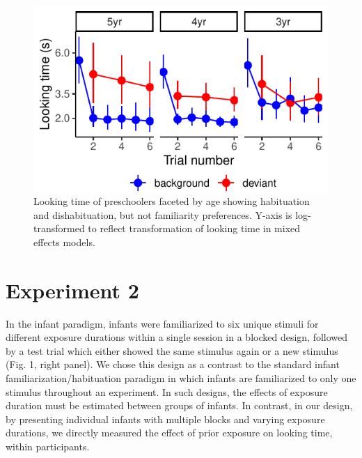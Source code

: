 \documentclass[10pt, letterpaper]{article}
\newenvironment{CodeChunk}{}{}
\begin{document}
\begin{CodeChunk}
\begin{figure}[t!]

\includegraphics{figs/unnamed-chunk-13-1} \hfill{}

\caption[Looking time of preschoolers faceted by age showing habituation and dishabituation, but not familiarity preferences]{Looking time of preschoolers faceted by age showing habituation and dishabituation, but not familiarity preferences. Y-axis is log-transformed to reflect transformation of looking time in mixed effects models.}\label{fig:unnamed-chunk-13}
\end{figure}
\end{CodeChunk}

\hypertarget{experiment-2}{%
\section{Experiment 2}\label{experiment-2}}

In the infant paradigm, infants were familiarized to six unique stimuli
for different exposure durations within a single session in a blocked
design, followed by a test trial which either showed the same stimulus
again or a new stimulus (Fig. 1, right panel). We chose this design as a
contrast to the standard infant familiarization/habituation paradigm in
which infants are familiarized to only one stimulus throughout an
experiment. In such designs, the effects of exposure duration must be
estimated between groups of infants. In contrast, in our design, by
presenting individual infants with multiple blocks and varying exposure
durations, we directly measured the effect of prior exposure on looking
time, within participants.
\end{document}
